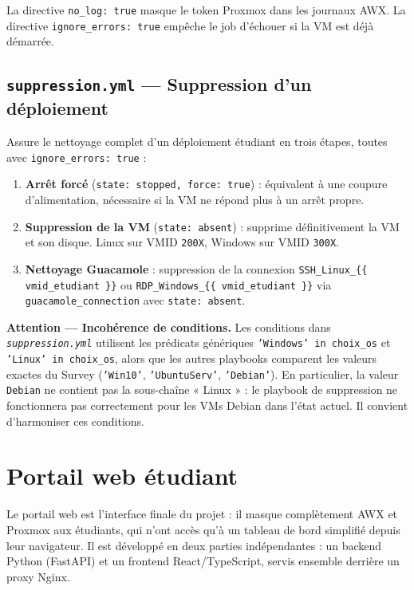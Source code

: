 \documentclass[a4paper]{article}
\newcommand{\cmd}[1]{\texttt{#1}}
\newcommand{\file}[1]{\texttt{\textit{#1}}}
\begin{document}
La directive \cmd{no\_log: true} masque le token Proxmox dans les journaux AWX. La directive \cmd{ignore\_errors: true} empêche le job d'échouer si la VM est déjà démarrée.

\subsection{\texttt{suppression.yml} --- Suppression d'un déploiement}

Assure le nettoyage complet d'un déploiement étudiant en trois étapes, toutes avec \cmd{ignore\_errors: true} :

\begin{enumerate}
  \item \textbf{Arrêt forcé} (\cmd{state: stopped, force: true}) : équivalent à une coupure d'alimentation, nécessaire si la VM ne répond plus à un arrêt propre.
  \item \textbf{Suppression de la VM} (\cmd{state: absent}) : supprime définitivement la VM et son disque. Linux sur VMID \cmd{200X}, Windows sur VMID \cmd{300X}.
  \item \textbf{Nettoyage Guacamole} : suppression de la connexion \cmd{SSH\_Linux\_\{\{ vmid\_etudiant \}\}} ou \cmd{RDP\_Windows\_\{\{ vmid\_etudiant \}\}} via \cmd{guacamole\_connection} avec \cmd{state: absent}.
\end{enumerate}

\begin{warnbox}
  \textbf{Attention --- Incohérence de conditions.} Les conditions dans \file{suppression.yml} utilisent les prédicats génériques \cmd{'Windows' in choix\_os} et \cmd{'Linux' in choix\_os}, alors que les autres playbooks comparent les valeurs exactes du Survey (\cmd{'Win10'}, \cmd{'UbuntuServ'}, \cmd{'Debian'}). En particulier, la valeur \cmd{Debian} ne contient pas la sous-chaîne « Linux » : le playbook de suppression ne fonctionnera pas correctement pour les VMs Debian dans l'état actuel. Il convient d'harmoniser ces conditions.
\end{warnbox}


\section{Portail web étudiant}

Le portail web est l'interface finale du projet : il masque complètement AWX et Proxmox aux étudiants, qui n'ont accès qu'à un tableau de bord simplifié depuis leur navigateur. Il est développé en deux parties indépendantes : un backend Python (FastAPI) et un frontend React/TypeScript, servis ensemble derrière un proxy Nginx.
\end{document}
